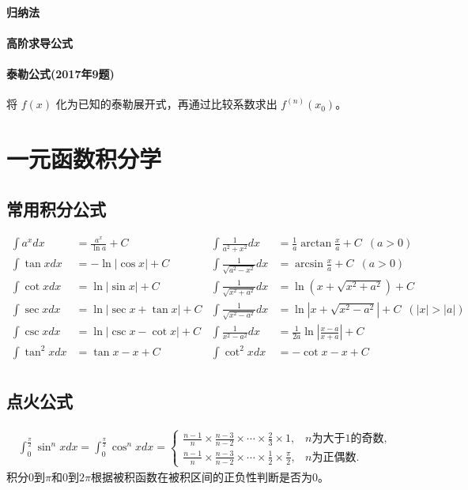 ﻿\documentclass[a4paper,12pt,UTF8]{ctexart}
\begin{document}
    \paragraph{归纳法}

    \paragraph{高阶求导公式}

    \paragraph{泰勒公式(2017年9题)}
    将 \(f(x)\) 化为已知的泰勒展开式，再通过比较系数求出 \(f^{(n)}(x_0)\)。

    \section{一元函数积分学}

    \subsection{常用积分公式}
    \begin{align*}
        \int {a}^{x} dx& = \frac{{a}^{x}}{\ln a}+C& \int \frac{1}{a^{2}+x^{2}}dx& = \frac{1}{a}\arctan\frac{x}{a}+C \enspace (a>0)&\\
        \int \tan x dx& = -\ln \left|\cos x \right|+C& \int \frac{1}{\sqrt{a^{2}-x^{2}}}dx& = \arcsin\frac{x}{a}+C \enspace (a>0)&\\
        \int \cot x dx& = \ln \left|\sin x \right|+C& \int \frac{1}{\sqrt{x^{2}+a^{2}}}dx& = \ln\left(x+\sqrt{x^{2}+a^{2}}\right)+C&\\
        \int \sec x dx& = \ln \left|\sec x + \tan x \right|+C& \int \frac{1}{\sqrt{x^{2}-a^{2}}}dx& = \ln\left|x+\sqrt{x^{2}-a^{2}}\right|+C \enspace (\left|x\right|>\left|a\right|)&\\
        \int \csc x dx& = \ln \left|\csc x - \cot x \right|+C& \int \frac{1}{x^{2}-a^{2}}dx& = \frac{1}{2a}\ln\left|\frac{x-a}{x+a}\right|+C&\\
        \int \tan^2 x dx& = \tan x-x+C& \int \cot^2 x dx& = -\cot x-x+C& \\
    \end{align*}
    
    \subsection{点火公式}
    \begin{align*}
        \int_{0}^{\frac{\pi}{2}} \sin^{n}x dx = \int_{0}^{\frac{\pi}{2}} \cos^{n}x dx =
        \begin{cases}
            \frac{n-1}{n} \times \frac{n-3}{n-2} \times \cdots \times \frac{2}{3} \times 1,& n \text{为大于} 1 \text{的奇数},\\
            \frac{n-1}{n} \times \frac{n-3}{n-2} \times \cdots \times \frac{1}{2} \times \frac{\pi}{2},& n \text{为正偶数}.
        \end{cases}
    \end{align*}
    积分0到\(\pi\)和0到\(2\pi\)根据被积函数在被积区间的正负性判断是否为0。
\end{document}
